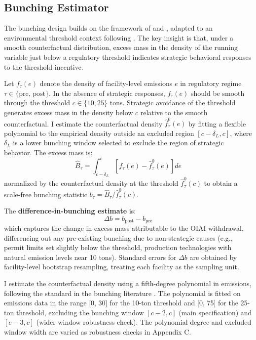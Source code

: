 \documentclass[12pt]{article}
\begin{document}
\subsection{Bunching Estimator}

The bunching design builds on the framework of \citet{Saez2010} and \citet{ChettyFriedmanOlsenPistaferri2011}, adapted to an environmental threshold context following \citet{OzaltunShapiroWalker2025}. The key insight is that, under a smooth counterfactual distribution, excess mass in the density of the running variable just below a regulatory threshold indicates strategic behavioral responses to the threshold incentive.

Let $f_{\tau}(e)$ denote the density of facility-level emissions $e$ in regulatory regime $\tau \in \{\text{pre, post}\}$. In the absence of strategic responses, $f_{\tau}(e)$ should be smooth through the threshold $c \in \{10, 25\}$ tons. Strategic avoidance of the threshold generates excess mass in the density below $c$ relative to the smooth counterfactual. I estimate the counterfactual density $\hat{f}^0_{\tau}(e)$ by fitting a flexible polynomial to the empirical density outside an excluded region $[c - \delta_L, c]$, where $\delta_L$ is a lower bunching window selected to exclude the region of strategic behavior. The excess mass is:
\begin{equation}
\hat{B}_\tau = \int_{c - \delta_L}^{c} \left[ f_{\tau}(e) - \hat{f}^0_{\tau}(e) \right] de
\end{equation}
normalized by the counterfactual density at the threshold $\hat{f}^0_{\tau}(c)$ to obtain a scale-free bunching statistic $b_\tau = \hat{B}_\tau / \hat{f}^0_{\tau}(c)$.

The \textbf{difference-in-bunching estimate} is:
\begin{equation}
\Delta b = b_{\text{post}} - b_{\text{pre}}
\end{equation}
which captures the change in excess mass attributable to the OIAI withdrawal, differencing out any pre-existing bunching due to non-strategic causes (e.g., permit limits set slightly below the threshold, production technologies with natural emission levels near 10 tons). Standard errors for $\Delta b$ are obtained by facility-level bootstrap resampling, treating each facility as the sampling unit.

I estimate the counterfactual density using a fifth-degree polynomial in emissions, following the standard in the bunching literature \citep{Kleven2016}. The polynomial is fitted on emissions data in the range [0, 30] for the 10-ton threshold and [0, 75] for the 25-ton threshold, excluding the bunching window $[c - 2, c]$ (main specification) and $[c - 3, c]$ (wider window robustness check). The polynomial degree and excluded window width are varied as robustness checks in Appendix C.
\end{document}
